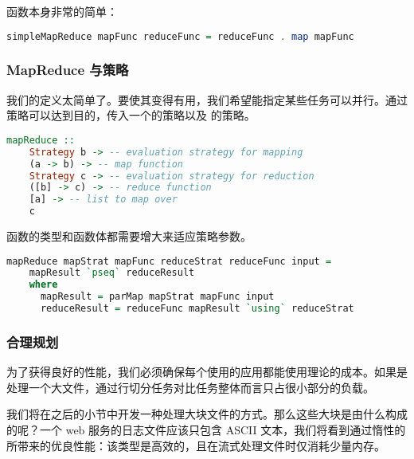 \documentclass[./main.tex]{subfiles}
\begin{document}
函数本身非常的简单：

\begin{lstlisting}[language=Haskell]
  simpleMapReduce mapFunc reduceFunc = reduceFunc . map mapFunc
\end{lstlisting}

\subsubsection*{MapReduce 与策略}

我们的定义太简单了。要使其变得有用，我们希望能指定某些任务可以并行。通过策略可以达到目的，传入一个的策略以及
的策略。

\begin{lstlisting}[language=Haskell]
  mapReduce ::
    Strategy b -> -- evaluation strategy for mapping
    (a -> b) -> -- map function
    Strategy c -> -- evaluation strategy for reduction
    ([b] -> c) -> -- reduce function
    [a] -> -- list to map over
    c
\end{lstlisting}

函数的类型和函数体都需要增大来适应策略参数。

\begin{lstlisting}[language=Haskell]
  mapReduce mapStrat mapFunc reduceStrat reduceFunc input =
    mapResult `pseq` reduceResult
    where
      mapResult = parMap mapStrat mapFunc input
      reduceResult = reduceFunc mapResult `using` reduceStrat
\end{lstlisting}

\subsubsection*{合理规划}

为了获得良好的性能，我们必须确保每个使用的应用都能使用理论的成本。如果是处理一个大文件，通过行切分任务对比任务整体而言只占很小部分的负载。

我们将在之后的小节中开发一种处理大块文件的方式。那么这些大块是由什么构成的呢？一个 web 服务的日志文件应该只包含 ASCII 文本，我们将看到通过惰性的
所带来的优良性能：该类型是高效的，且在流式处理文件时仅消耗少量内存。
\end{document}

